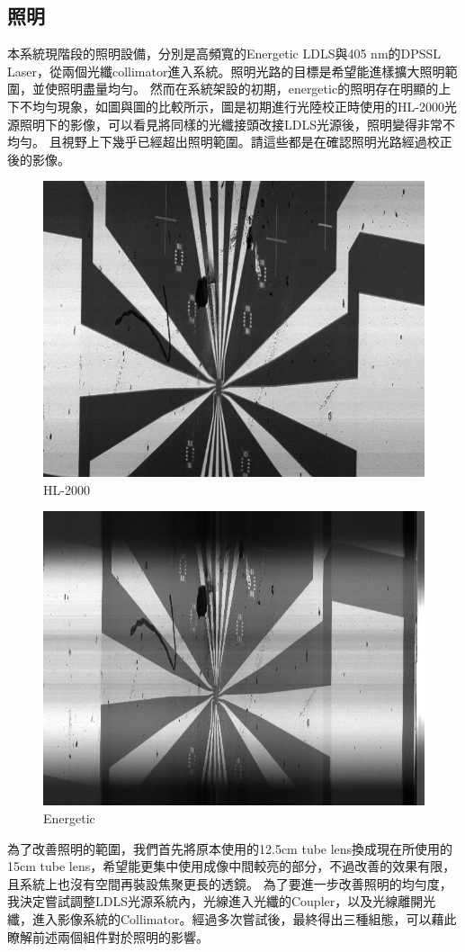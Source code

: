 \documentclass[12pt]{article}
\begin{document}
    \subsection{照明}
    本系統現階段的照明設備，分別是高頻寬的Energetic LDLS與405 nm的DPSSL Laser，從兩個光纖collimator進入系統。照明光路的目標是希望能進樣擴大照明範圍，並使照明盡量均勻。
    然而在系統架設的初期，energetic的照明存在明顯的上下不均勻現象，如圖與圖的比較所示，圖是初期進行光陸校正時使用的HL-2000光源照明下的影像，可以看見將同樣的光纖接頭改接LDLS光源後，照明變得非常不均勻。
    且視野上下幾乎已經超出照明範圍。請這些都是在確認照明光路經過校正後的影像。
    \begin{figure}
        \centering
        \includegraphics[width=0.5\linewidth]{0831focusForOmFullScanHL2000Scaled.jpg}
        \caption{HL-2000}
    \end{figure}
    \begin{figure}
        \centering
        \includegraphics[width=0.5\linewidth]{0909Energetic.jpg}
        \caption{Energetic}
    \end{figure}
    為了改善照明的範圍，我們首先將原本使用的12.5cm tube lens換成現在所使用的15cm tube lens，希望能更集中使用成像中間較亮的部分，不過改善的效果有限，且系統上也沒有空間再裝設焦聚更長的透鏡。
    為了要進一步改善照明的均勻度，我決定嘗試調整LDLS光源系統內，光線進入光纖的Coupler，以及光線離開光纖，進入影像系統的Collimator。經過多次嘗試後，最終得出三種組態，可以藉此瞭解前述兩個組件對於照明的影響。
\end{document}
